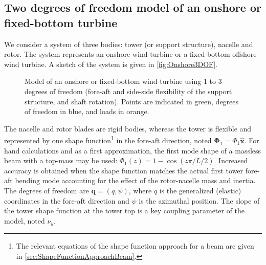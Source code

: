 \documentclass[wes, manuscript]{copernicus}
\renewcommand{\v}[1]{\boldsymbol{#1}}
\begin{document}




\subsection{Two degrees of freedom model of an onshore or fixed-bottom turbine}
\label{sec:Onshore1DOF}\label{sec:Onshore2DOF}
We consider a system of three bodies: tower (or support structure), nacelle and rotor.
The system represents an onshore wind turbine or a fixed-bottom offshore wind turbine. 
A sketch of the system is given in \autoref{fig:Onshore3DOF}. 
\begin{figure}[!htb]%
 \centering%
 \def\svgwidth{0.6\columnwidth}%
 \caption{Model of an onshore or fixed-bottom wind turbine using 1 to 3 degrees of freedom (fore-aft and side-side flexibility of the support structure, and shaft rotation). Points are indicated in green, degrees of freedom in blue, and loads in orange.}\label{fig:Onshore3DOF}%
 \end{figure}%
The nacelle and rotor blades are rigid bodies, whereas the tower is flexible and represented by one shape function\footnote{
The relevant equations of the shape function approach for a beam are given in \autoref{sec:ShapeFunctionApproachBeam}.} in the fore-aft direction, noted $\v{\Phi}_1=\Phi_1 \v{\hat{x}}$.
For hand calculations and as a first approximation, the first mode shape of a massless beam with a top-mass may be used: $\Phi_1(z)=1-\cos(z\pi/L/2)$.
Increased accuracy is obtained when the shape function matches the actual first tower fore-aft bending mode accounting for the effect of the rotor-nacelle mass and inertia.
    The degrees of freedom are $\v{q}=(q, \psi)$, where $q$ is the generalized (elastic) coordinates in the fore-aft direction and $\psi$ is the azimuthal position.
The slope of the tower shape function at the tower top is a key coupling parameter of the model, noted  $\nu_y$.
\end{document}
